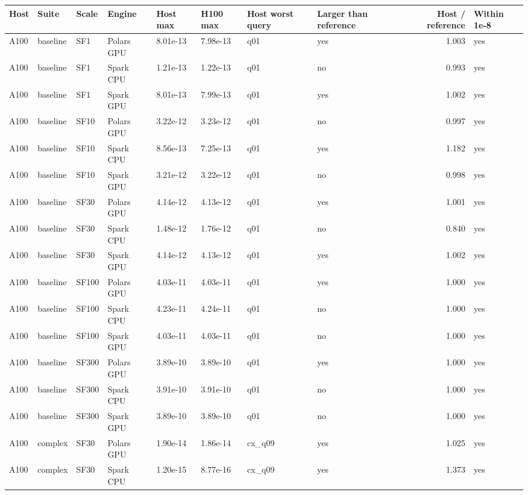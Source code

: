 \begin{longtable}{llllllllrl}
\toprule
Host & Suite & Scale & Engine & Host max & H100 max & Host worst query & Larger than reference & Host / reference & Within 1e-8 \\
\midrule
\endhead
\bottomrule
\endfoot
A100 & baseline & SF1 & Polars GPU & 8.01e-13 & 7.98e-13 & q01 & yes & 1.003 & yes \\
A100 & baseline & SF1 & Spark CPU & 1.21e-13 & 1.22e-13 & q01 & no & 0.993 & yes \\
A100 & baseline & SF1 & Spark GPU & 8.01e-13 & 7.99e-13 & q01 & yes & 1.002 & yes \\
A100 & baseline & SF10 & Polars GPU & 3.22e-12 & 3.23e-12 & q01 & no & 0.997 & yes \\
A100 & baseline & SF10 & Spark CPU & 8.56e-13 & 7.25e-13 & q01 & yes & 1.182 & yes \\
A100 & baseline & SF10 & Spark GPU & 3.21e-12 & 3.22e-12 & q01 & no & 0.998 & yes \\
A100 & baseline & SF30 & Polars GPU & 4.14e-12 & 4.13e-12 & q01 & yes & 1.001 & yes \\
A100 & baseline & SF30 & Spark CPU & 1.48e-12 & 1.76e-12 & q01 & no & 0.840 & yes \\
A100 & baseline & SF30 & Spark GPU & 4.14e-12 & 4.13e-12 & q01 & yes & 1.002 & yes \\
A100 & baseline & SF100 & Polars GPU & 4.03e-11 & 4.03e-11 & q01 & yes & 1.000 & yes \\
A100 & baseline & SF100 & Spark CPU & 4.23e-11 & 4.24e-11 & q01 & no & 1.000 & yes \\
A100 & baseline & SF100 & Spark GPU & 4.03e-11 & 4.03e-11 & q01 & no & 1.000 & yes \\
A100 & baseline & SF300 & Polars GPU & 3.89e-10 & 3.89e-10 & q01 & yes & 1.000 & yes \\
A100 & baseline & SF300 & Spark CPU & 3.91e-10 & 3.91e-10 & q01 & no & 1.000 & yes \\
A100 & baseline & SF300 & Spark GPU & 3.89e-10 & 3.89e-10 & q01 & no & 1.000 & yes \\
A100 & complex & SF30 & Polars GPU & 1.90e-14 & 1.86e-14 & cx\_q09 & yes & 1.025 & yes \\
A100 & complex & SF30 & Spark CPU & 1.20e-15 & 8.77e-16 & cx\_q09 & yes & 1.373 & yes \\

\end{longtable}
